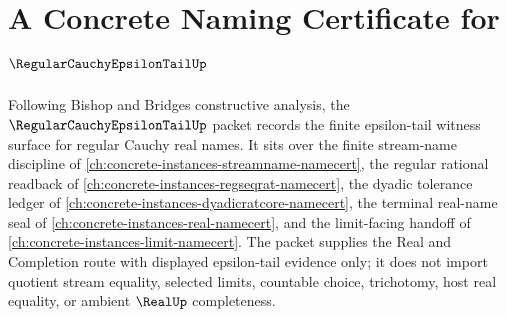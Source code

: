 \chapter{A Concrete Naming Certificate for $\RegularCauchyEpsilonTailUp$}
\label{ch:concrete-instances-regular-cauchy-epsilon-tail-namecert}

Following Bishop and Bridges constructive analysis, the $\RegularCauchyEpsilonTailUp$ packet records the finite epsilon-tail witness surface for regular Cauchy real names. It sits over the finite stream-name discipline of \autoref{ch:concrete-instances-streamname-namecert}, the regular rational readback of \autoref{ch:concrete-instances-regseqrat-namecert}, the dyadic tolerance ledger of \autoref{ch:concrete-instances-dyadicratcore-namecert}, the terminal real-name seal of \autoref{ch:concrete-instances-real-namecert}, and the limit-facing handoff of \autoref{ch:concrete-instances-limit-namecert}. The packet supplies the Real and Completion route with displayed epsilon-tail evidence only; it does not import quotient stream equality, selected limits, countable choice, trichotomy, host real equality, or ambient $\RealUp$ completeness.

